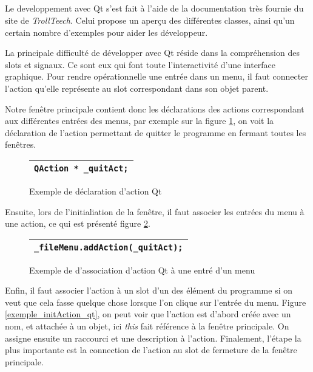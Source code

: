 \subparagraph{}
Le developpement avec Qt s'est fait \`a l'aide de la documentation tr\`es fournie du site de \textit{TrollTeech}. Celui propose un aper\c cu des diff\'erentes classes, ainsi qu'un certain nombre d'exemples pour aider les d\'eveloppeur.
\par
La principale difficult\'e de d\'evelopper avec Qt r\'eside dans la compr\'ehension des slots et signaux. Ce sont eux qui font toute l'interactivit\'e d'une interface graphique. Pour rendre op\'erationnelle une entr\'ee dans un menu, il faut connecter l'action qu'elle repr\'esente au slot correspondant dans son objet parent.
\par
Notre fen\^etre principale contient donc les d\'eclarations des actions correspondant aux diff\'erentes entr\'ees des menus, par exemple sur la figure \ref{exemple_action_qt}, on voit la d\'eclaration de l'action permettant de quitter le programme en fermant toutes les fen\^etres.
\begin{figure}[H]
   \begin{center}
      \begin{tabular}{l}
         \hline
         \verb|QAction * _quitAct;|\\
         \hline
      \end{tabular}
   \end{center}
\caption{\label{exemple_action_qt} Exemple de d\'eclaration d'action Qt}
\end{figure}
Ensuite, lors de l'initialiation de la fen\^etre, il faut associer les 
entr\'ees du menu \`a une action, ce qui est pr\'esent\'e figure \ref{exemple_menu_qt}.

\begin{figure}[H]
   \begin{center}
      \begin{tabular}{l}
         \hline
         \verb|_fileMenu.addAction(_quitAct);|\\
         \hline
      \end{tabular}
   \end{center}
\caption{\label{exemple_menu_qt} Exemple de d'association d'action Qt \`a une entr\'e d'un menu}
\end{figure}

Enfin, il faut associer l'action \`a un slot d'un des \'el\'ement du programme si on veut que cela fasse quelque chose lorsque l'on clique sur l'entr\'ee du menu. Figure \ref{exemple_initAction_qt}, on peut voir que l'action est d'abord cr\'e\'ee avec un nom, et attach\'ee \`a un objet, ici \textit{this} fait r\'ef\'erence \`a la fen\^etre principale. On assigne ensuite un raccourci et une description \`a l'action. Finalement, l'\'etape la plus importante est la connection de l'action au slot de fermeture de la fen\^etre principale.

